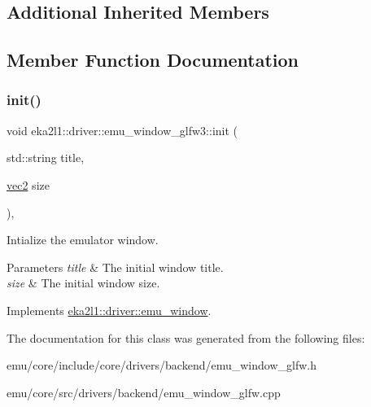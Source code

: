 \subsection*{Additional Inherited Members}


\subsection{Member Function Documentation}
\mbox{\label{classeka2l1_1_1driver_1_1emu__window__glfw3_af2bfbaf8879c5ccb627c08aea9135073}} 
\subsubsection{\texorpdfstring{init()}{init()}}
{\footnotesize\ttfamily void eka2l1\+::driver\+::emu\+\_\+window\+\_\+glfw3\+::init (\begin{DoxyParamCaption}\item[{std\+::string}]{title,  }\item[{\mbox{\hyperlink{structeka2l1_1_1vec2}{vec2}}}]{size }\end{DoxyParamCaption})\hspace{0.3cm}{\ttfamily [override]}, {\ttfamily [virtual]}}



Intialize the emulator window. 


\begin{DoxyParams}{Parameters}
{\em title} & The initial window title. \\
\hline
{\em size} & The initial window size. \\
\hline
\end{DoxyParams}


Implements \mbox{\hyperlink{classeka2l1_1_1driver_1_1emu__window_a5cc29dfd4fd4de6b760bb33442a9a654}{eka2l1\+::driver\+::emu\+\_\+window}}.



The documentation for this class was generated from the following files\+:\begin{DoxyCompactItemize}
\item 
emu/core/include/core/drivers/backend/emu\+\_\+window\+\_\+glfw.\+h\item 
emu/core/src/drivers/backend/emu\+\_\+window\+\_\+glfw.\+cpp\end{DoxyCompactItemize}
